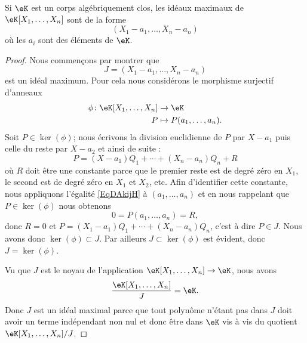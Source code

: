 \begin{theorem}  \label{ThowgZYqx}
    Si \( \eK\) est un corps algébriquement clos, les idéaux maximaux de \( \eK[X_1,\ldots, X_n]\) sont de la forme
    \begin{equation}
        (X_1-a_1,\ldots, X_n-a_n)
    \end{equation}
    où les \( a_i\) sont des éléments de \( \eK\).
\end{theorem}

\begin{proof}
    Nous commençons par montrer que
    \begin{equation}
        J=(X_1-a_1,\ldots, X_n-a_n)
    \end{equation}
    est un idéal maximum. Pour cela nous considérons le morphisme surjectif d'anneaux
    \begin{equation}
        \begin{aligned}
            \phi\colon \eK[X_1,\ldots, X_n]&\to \eK \\
            P&\mapsto P(a_1,\ldots, a_n).
        \end{aligned}
    \end{equation}
    Soit \( P\in\ker(\phi)\); nous écrivons la division euclidienne de \( P\) par \( X-a_1\) puis celle du reste par \( X-a_2\) et ainsi de suite :
    \begin{equation}    \label{EqDAkijH}
        P=(X-a_1)Q_1+\cdots +(X_n-a_n)Q_n+R
    \end{equation}
    où \( R\) doit être une constante parce que le premier reste est de degré zéro en \( X_1\), le second est de degré zéro en \( X_1\) et \( X_2\), etc. Afin d'identifier cette constante, nous appliquons l'égalité \eqref{EqDAkijH} à \( (a_1,\ldots, a_n)\) et en nous rappelant que \( P\in \ker(\phi)\) nous obtenons
    \begin{equation}
        0=P(a_1,\ldots, a_n)=R,
    \end{equation}
    donc \( R=0\) et \( P=(X_1-a_1)Q_1+\cdots +(X_n-a_n)Q_n\), c'est à dire \( P\in J\). Nous avons donc \( \ker(\phi)\subset J\). Par ailleurs \( J\subset \ker(\phi)\) est évident, donc \( J=\ker(\phi)\).

    Vu que \( J\) est le noyau de l'application \( \eK[X_1,\ldots, X_n]\to \eK\), nous avons
    \begin{equation}
        \frac{ \eK[X_1,\ldots, X_n] }{ J }=\eK.
    \end{equation}
    Donc \( J\) est un idéal maximal parce que tout polynôme n'étant pas dans \( J\) doit avoir un terme indépendant non nul et donc être dans \( \eK\) vis à vis du quotient \( \eK[X_1,\ldots, X_n]/J\).


\end{proof}
